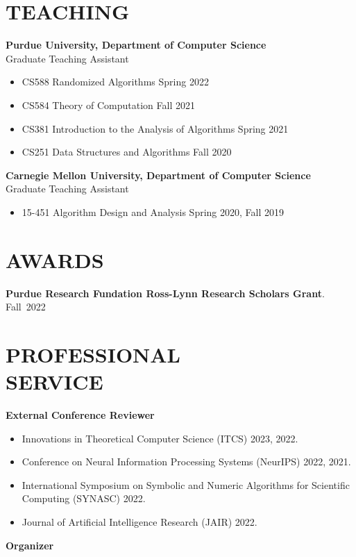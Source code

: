 \documentclass[margin, 10pt]{res} %
\begin{document}
\begin{resume}
\section{TEACHING}

{\bf Purdue University, Department of Computer Science}\\
Graduate Teaching Assistant

\begin{itemize}
\item CS588 Randomized Algorithms \hfill Spring 2022
\item CS584 Theory of Computation \hfill Fall 2021
\item CS381 Introduction to the Analysis of Algorithms \hfill Spring 2021
\item CS251 Data Structures and Algorithms \hfill Fall 2020
\end{itemize}
{\bf Carnegie Mellon University, Department of Computer Science}\\
Graduate Teaching Assistant

\begin{itemize}
\item 15-451 Algorithm Design and Analysis \hfill Spring 2020, Fall 2019
\end{itemize}

\section{AWARDS}
{\bf Purdue Research Fundation Ross-Lynn Research Scholars Grant}. \hfill Fall~2022

\section{PROFESSIONAL \\ SERVICE}

{\bf External Conference Reviewer}

\begin{itemize}
\item Innovations in Theoretical Computer Science (ITCS) 2023, 2022.
\item Conference on Neural Information Processing Systems (NeurIPS) 2022, 2021.
\item International Symposium on Symbolic and Numeric Algorithms for Scientific Computing (SYNASC) 2022.
\item Journal of Artificial Intelligence Research (JAIR) 2022.
\end{itemize}
{\bf Organizer}


\end{resume}
\end{document}
